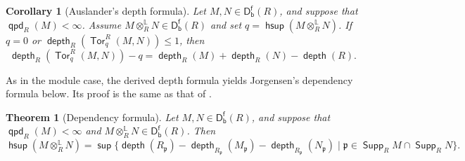 \documentclass[10pt, a4paper,reqno]{amsart}
\newtheorem{thm}{Theorem}[section]
\newtheorem{cor}[cor]{Corollary}
\newtheorem{lem}[lem]{Lemma}
\theoremstyle{definition}
\theoremstyle{remark}
\numberwithin{equation}{thm}
\def\fp{\mathfrak{p}}
\def\depth{\operatorname{\mathsf{depth}}}
\def\width{\operatorname{\mathsf{width}}}
\def\Tor{\operatorname{\mathsf{Tor}}}
\def\Supp{\operatorname{\mathsf{Supp}}}
\def\Dfb{\mathsf{D^f_b}}
\def\ltensor{\otimes^{\mathbb{L}}}
\def\sup{\operatorname{\mathsf{sup}}}
\def\hsup{\operatorname{\mathsf{hsup}}}
\def\hinf{\operatorname{\mathsf{hinf}}}
\def\qpd{\operatorname{\mathsf{qpd}}}
\begin{document}
\begin{cor}[Auslander's depth formula]
Let $M,N\in\Dfb(R)$, and suppose that $\qpd_R(M)<\infty$.
Assume $M\ltensor_RN\in\Dfb(R)$ and set $q = \hsup(M \ltensor_R N)$.
If $q = 0$ or $\depth_R(\Tor_q^R(M,N)) \le 1$, then
\[
\depth_R(\Tor_q^R(M,N)) - q =\depth_R(M)+\depth_R(N)-\depth (R).
\]
\end{cor}


As in the module case, the derived depth formula yields Jorgensen's dependency formula below.
Its proof is the same as that of \cite[Theorem 3.6]{FL}.

\begin{thm}[Dependency formula]\label{dep}
Let $M,N\in\Dfb(R)$, and suppose that $\qpd_R(M)<\infty$ and $M\ltensor_RN\in\Dfb(R)$.
Then
\[
\hsup(M\ltensor_RN)=\sup\{\depth (R_\fp)-\depth_{R_\fp}(M_\fp) - \depth_{R_\fp}(N_\fp) \mid \fp\in\Supp_RM\cap\Supp_RN\}.
\]
\end{thm}

\end{document}
